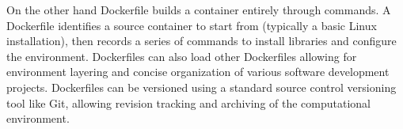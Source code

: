 On the other hand Dockerfile builds a container entirely through commands. A Dockerfile identifies a source container to start from (typically a basic Linux installation), then records a series of commands to install libraries and configure the environment. Dockerfiles can also load other Dockerfiles allowing for environment layering and concise organization of various software development projects. Dockerfiles can be versioned using a standard source control versioning tool like Git, allowing revision tracking and archiving of the computational environment.
